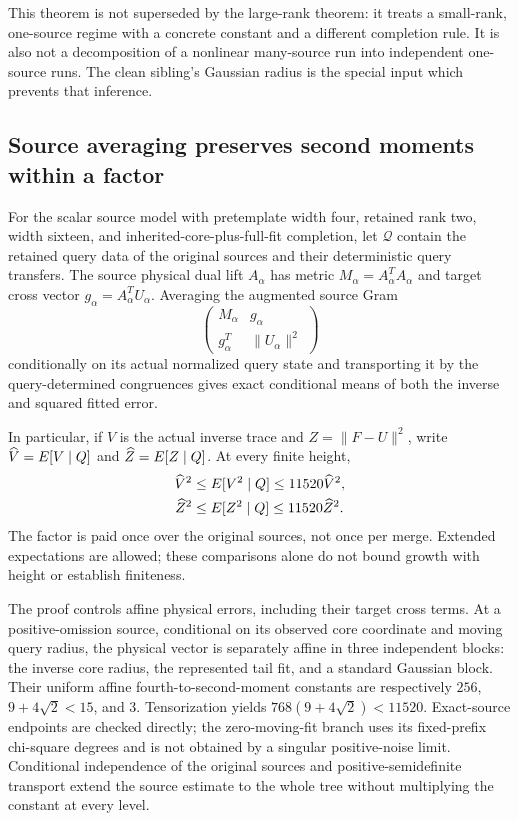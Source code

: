\documentclass[11pt,oneside,openany,a4paper]{report}
\numberwithin{equation}{chapter}
\theoremstyle{definition}
\theoremstyle{remark}
\begin{document}
This theorem is not superseded by the large-rank theorem: it treats a
small-rank, one-source regime with a concrete constant and a different
completion rule.  It is also not a decomposition of a nonlinear
many-source run into independent one-source runs.  The clean sibling's
Gaussian radius is the special input which prevents that inference.

\subsection{Source averaging preserves second moments within a factor}

For the scalar source model with pretemplate width four, retained rank
two, width sixteen, and inherited-core-plus-full-fit completion, let
$\mathcal Q$ contain the retained query data of the original sources
and their deterministic query transfers.  The source physical dual
lift $A_\alpha$ has metric $M_\alpha=A_\alpha^TA_\alpha$ and target
cross vector $g_\alpha=A_\alpha^TU_\alpha$.  Averaging the augmented
source Gram
\[
 \begin{pmatrix}
 M_\alpha&g_\alpha\\g_\alpha^T&\lVert U_\alpha\rVert^2
 \end{pmatrix}
\]
conditionally on its actual normalized query state and transporting it
by the query-determined congruences gives exact conditional means of
both the inverse and squared fitted error.

In particular, if $V$ is the actual inverse trace and
$Z=\lVert F-U\rVert^2$, write
$\widehat V=E[V\mid Q]$ and
$\widehat Z=E[Z\mid Q]$.  At every finite height,
\begin{align}
 \widehat V^2&\leq E[V^2\mid Q]
                         \leq11520\widehat V^2,\\
 \widehat Z^2&\leq E[Z^2\mid Q]
                         \leq11520\widehat Z^2.
 \label{eq:route-source-comparison}
\end{align}
The factor is paid once over the original sources, not once per merge.
Extended expectations are allowed; these comparisons alone do not
bound growth with height or establish finiteness.

The proof controls affine physical errors, including their target
cross terms.  At a positive-omission source, conditional on its observed
core coordinate and moving query radius, the physical vector is
separately affine in three independent blocks: the inverse core radius,
the represented tail fit, and a standard Gaussian block.  Their uniform
affine fourth-to-second-moment constants are respectively
$256$, $9+4\sqrt2<15$, and $3$.  Tensorization yields
$768(9+4\sqrt2)<11520$.  Exact-source endpoints are checked directly;
the zero-moving-fit branch uses its fixed-prefix chi-square degrees
and is not obtained by a singular positive-noise limit.  Conditional
independence of the original sources and positive-semidefinite
transport extend the source estimate to the whole tree without
multiplying the constant at every level.
\end{document}
